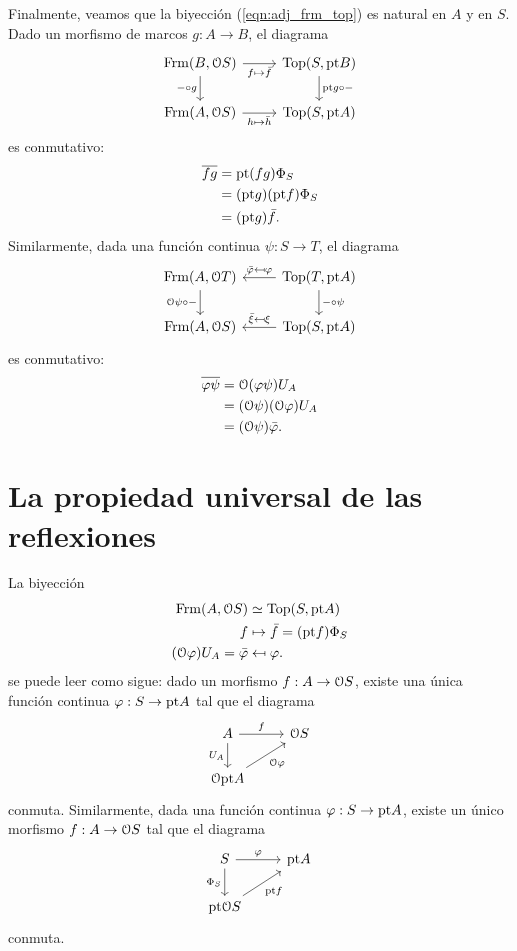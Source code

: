 Finalmente, veamos que la biyección (\ref{eqn:adj_frm_top})
es natural en $A$ y en $S$.
Dado un morfismo de marcos $g:A\to B$, el diagrama
\[
    \begin{tikzcd}
        \Frm(B,\cal OS) \ar[d,"{-}\circ g"'] \ar[r,"f\mapsto\bar f"']
        & \Top(S,\pt B)
        \ar[d,"\pt g\circ{-}"]
        \\
        \Frm(A,\cal OS) \ar[r,"h\mapsto\bar h"']
        & \Top(S,\pt A)
    \end{tikzcd}
\]
es conmutativo:
\begin{align*}
    \ol{fg}
    &= \pt(fg)\Phi_S \\
    &= (\pt g)(\pt f)\Phi_S \\
    &= (\pt g)\bar f.
\end{align*}
Similarmente, dada una función continua $\psi:S\to T$,
el diagrama
\[
    \begin{tikzcd}
        \Frm(A,\cal OT)
        \ar[d,"\cal O\psi\circ{-}"']
        & \Top(T,\pt A) \ar[l,"\bar \phi\mapsfrom \phi"']
        \ar[d,"{-}\circ \psi"]
        \\
        \Frm(A,\cal OS)
        & \Top(S,\pt A) \ar[l,"\bar \xi\mapsfrom \xi"']
    \end{tikzcd}
\]
es conmutativo:
\begin{align*}
    \ol{\phi\psi}
    &= \cal O(\phi\psi)U_A \\
    &= (\cal O\psi)(\cal O\phi)U_A \\
    &= (\cal O\psi)\bar\phi.
\end{align*}

\section{La propiedad universal de las reflexiones}
La biyección
\begin{align*}
    \Frm(A,\cal OS) &\simeq \Top(S,\pt A) \\
    f &\mapsto \bar f = (\pt f)\Phi_S \\
    (\cal O\phi)U_A = \bar\phi &\mapsfrom \phi.
\end{align*}
se puede leer como sigue:
dado un morfismo $f:A\to\cal OS$, existe una única función continua
$\phi:S\to\pt A$ tal que el diagrama
\[
    \begin{tikzcd}
        A \ar[r,"f"] \ar[d,"U_A"'] & \cal OS \\
        \cal O\pt A \ar[ur,"\cal O\phi"']
    \end{tikzcd}
\]
conmuta.
Similarmente, dada una función continua $\phi:S\to\pt A$, existe
un único morfismo $f:A\to\cal OS$ tal que el diagrama
\[
    \begin{tikzcd}
        S \ar[r,"\phi"] \ar[d,"\Phi_S"'] & \pt A \\
        \pt\cal OS \ar[ur,"\pt f"']
    \end{tikzcd}
\]
conmuta.

